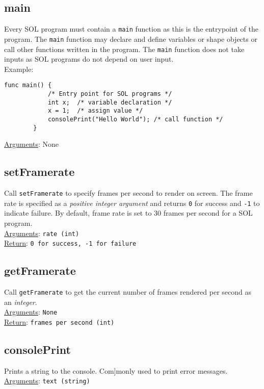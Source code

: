     \subsection{main}
    Every SOL program must contain a \texttt{main} function as this is the entrypoint of the program. The \texttt{main} function may declare and define variables or shape objects or call other functions written in the program. The \texttt{main} function does not take inputs as SOL programs do not depend on user input.\\
    Example:\\
    \begin{lstlisting}[style=sol]
        func main() {
            /* Entry point for SOL programs */
            int x;  /* variable declaration */
            x = 1;  /* assign value */
            consolePrint("Hello World"); /* call function */
        }
    \end{lstlisting}
    \underline{Arguments}: None

    \subsection{setFramerate}
    Call \texttt{setFramerate} to specify frames per second to render on screen. The frame rate is specified as a \textit{positive integer argument} and returns \texttt{0} for success and \texttt{-1} to indicate failure. By default, frame rate is set to 30 frames per second for a SOL program.\\
    \underline{Arguments}: \texttt{rate (int)}\\
    \underline{Return}: \texttt{0 for success, -1 for failure}

    \subsection{getFramerate}
    Call \texttt{getFramerate} to get the current number of frames rendered per second as an \textit{integer}.\\
    \underline{Arguments}: \texttt{None}\\
    \underline{Return}: \texttt{frames per second (int)}

    \subsection{consolePrint}
    Prints a string to the console. Com]monly used to print error messages.\\
    \underline{Arguments}: \texttt{text (string)}

